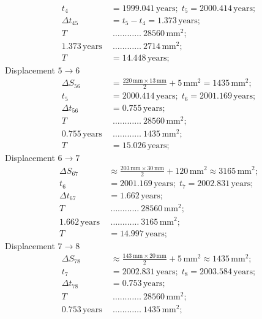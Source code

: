 \begin{description}
\begin{align*}
    t_4 &= 1999.041\,\mathrm{years};\; t_5 = 2000.414\,\mathrm{years};\\
    \Delta t_{45} &= t_5 - t_4 = 1.373\,\mathrm{years};\\
    T\ &\ \dots\dots\dots\dots\ 28560\,\mathrm{mm}^2;\\
    1.373\,\mathrm{years}\ &\ \dots\dots\dots\dots\ 2714\,\mathrm{mm}^2;\\
    T &= 14.448\,\mathrm{years};
  \end{align*}
  Displacement $5 \rightarrow 6$
  \begin{align*}
    \Delta S_{56} &= \frac{220\,\mathrm{mm}\times13\,\mathrm{mm}}{2}
      + 5\,\mathrm{mm}^2 = 1435\,\mathrm{mm}^2;\\
    t_5 &= 2000.414\,\mathrm{years};\; t_6 = 2001.169\,\mathrm{years};\\
    \Delta t_{56} &= 0.755\,\mathrm{years};\\
    T\ &\ \dots\dots\dots\dots\ 28560\,\mathrm{mm}^2;\\
    0.755\,\mathrm{years}\ &\ \dots\dots\dots\dots\ 1435\,\mathrm{mm}^2;\\
    T &= 15.026\,\mathrm{years};
  \end{align*}
  Displacement $6 \rightarrow 7$
  \begin{align*}
    \Delta S_{67} &\approx \frac{203\,\mathrm{mm}\times30\,\mathrm{mm}}{2}
      + 120\,\mathrm{mm}^2 \approx 3165\,\mathrm{mm}^2;\\
    t_6 &= 2001.169\,\mathrm{years};\; t_7 = 2002.831\,\mathrm{years};\\
    \Delta t_{67} &= 1.662\,\mathrm{years};\\
    T\ &\ \dots\dots\dots\dots\ 28560\,\mathrm{mm}^2;\\
    1.662\,\mathrm{years}\ &\ \dots\dots\dots\dots\ 3165\,\mathrm{mm}^2;\\
    T &= 14.997\,\mathrm{years};
  \end{align*}
  Displacement $7 \rightarrow 8$
  \begin{align*}
    \Delta S_{78} &\approx \frac{143\,\mathrm{mm}\times20\,\mathrm{mm}}{2}
      + 5\,\mathrm{mm}^2 \approx 1435\,\mathrm{mm}^2;\\
    t_7 &= 2002.831\,\mathrm{years};\; t_8 = 2003.584\,\mathrm{years};\\
    \Delta t_{78} &= 0.753\,\mathrm{years};\\
    T\ &\ \dots\dots\dots\dots\ 28560\,\mathrm{mm}^2;\\
    0.753\,\mathrm{years}\ &\ \dots\dots\dots\dots\ 1435\,\mathrm{mm}^2;\\

\end{align*}
\end{description}
